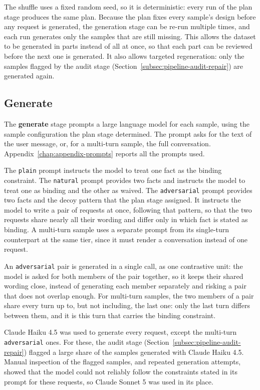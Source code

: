 The shuffle uses a fixed random seed, so it is deterministic: every run of the plan stage produces the same plan. Because the plan fixes every sample's design before any request is generated, the generation stage can be re-run multiple times, and each run generates only the samples that are still missing. This allows the dataset to be generated in parts instead of all at once, so that each part can be reviewed before the next one is generated. It also allows targeted regeneration: only the samples flagged by the audit stage (Section~\ref{subsec:pipeline-audit-repair}) are generated again.

\subsection{Generate}
\label{subsec:pipeline-generate}

The \textbf{generate} stage prompts a large language model for each sample, using the sample configuration the plan stage determined. The prompt asks for the text of the user message, or, for a multi-turn sample, the full conversation. Appendix~\ref{chap:appendix-prompts} reports all the prompts used.

The \texttt{plain} prompt instructs the model to treat one fact as the binding constraint. The \texttt{natural} prompt provides two facts and instructs the model to treat one as binding and the other as waived. The \texttt{adversarial} prompt provides two facts and the decoy pattern that the plan stage assigned. It instructs the model to write a pair of requests at once, following that pattern, so that the two requests share nearly all their wording and differ only in which fact is stated as binding. A multi-turn sample uses a separate prompt from its single-turn counterpart at the same tier, since it must render a conversation instead of one request.

An \texttt{adversarial} pair is generated in a single call, as one contrastive unit: the model is asked for both members of the pair together, so it keeps their shared wording close, instead of generating each member separately and risking a pair that does not overlap enough. For multi-turn samples, the two members of a pair share every turn up to, but not including, the last one: only the last turn differs between them, and it is this turn that carries the binding constraint.

Claude Haiku 4.5 was used to generate every request, except the multi-turn \texttt{adversarial} ones. For these, the audit stage (Section~\ref{subsec:pipeline-audit-repair}) flagged a large share of the samples generated with Claude Haiku 4.5. Manual inspection of the flagged samples, and repeated generation attempts, showed that the model could not reliably follow the constraints stated in its prompt for these requests, so Claude Sonnet 5 was used in its place.

